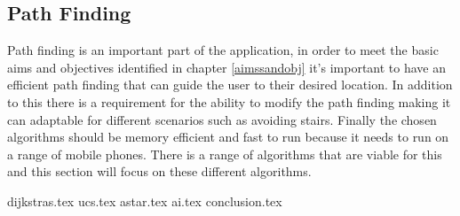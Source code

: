 \subsection{Path Finding}
Path finding is an important part of the application, in order to meet the basic aims and objectives identified in chapter \ref{aimssandobj} it's important to have an efficient path finding that can guide the user to their desired location. In addition to this there is a requirement for the ability to modify the path finding making it can adaptable for different scenarios such as avoiding stairs. Finally the chosen algorithms should be memory efficient and fast to run because it needs to run on a range of mobile phones. There is a range of algorithms that are viable for this and this section will focus on these different algorithms.

{dijkstras.tex}
{ucs.tex}
{astar.tex}
{ai.tex}
{conclusion.tex}
